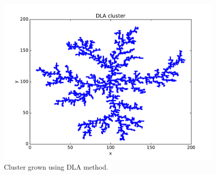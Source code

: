 \documentclass[aps,prl,preprint,superscriptaddress]{revtex4}
\begin{document}
\begin{figure}[H]
	\centering
	\includegraphics[width=1.0\textwidth]{dla.pdf}
	\caption{Cluster grown using DLA method. }
	\label{cluster}
\end{figure}
\end{document}
